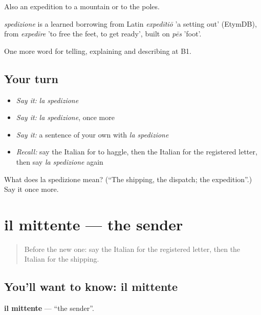 Also an expedition to a mountain or to the poles.

\begin{cousinweb}
\emph{spedizione} is a learned borrowing from Latin \emph{expedītiō} 'a setting out' (EtymDB), from \emph{expedīre} 'to free the feet, to get ready', built on \emph{pēs} 'foot'.
\end{cousinweb}

\begin{grammarlens}[title={What you've built}]
One more word for telling, explaining and describing at B1.
\end{grammarlens}

\subsection*{Your turn}
\begin{itemize}
\raggedright
  \item \emph{Say it:} \emph{la spedizione}
  \item \emph{Say it:} \emph{la spedizione}, once more
  \item \emph{Say it:} a sentence of your own with \emph{la spedizione}
  \item \emph{Recall:} say the Italian for to haggle, then the Italian for the registered letter, then say \emph{la spedizione} again
\end{itemize}

\begin{tcolorbox}[breakable,colback=teal!4,colframe=teal!35!black,title={Before you move on}]
What does la spedizione mean? (\textquotedblleft{}The shipping, the dispatch; the expedition\textquotedblright{}.) Say it once more.
\end{tcolorbox}
\section[il mittente]{il mittente — the sender}

\label{lesson:IT-C458-mittente}



\begin{quote}
Before the new one: say the Italian for the registered letter, then the Italian for the shipping.
\end{quote}

\subsection*{You'll want to know: il mittente}
\textbf{il mittente} — \textquotedblleft{}the sender\textquotedblright{}.

